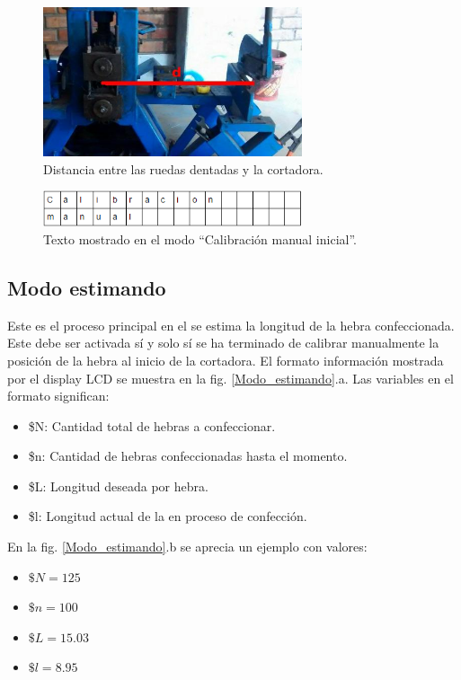 \documentclass[main_conf.tex]{subfiles}
\begin{document}
\begin{figure}[!t]
  \centering
  \includegraphics[width=3.0in]{../img/maquina/distancia_inicial.jpg}
  \caption{Distancia entre las ruedas dentadas y la cortadora.}
  \label{distancia_inicial}
\end{figure}

\begin{figure}[!t]
  \centering
  \includegraphics[width=3.0in]{../img/modo/Calibracion_manual_inicial.png}
  \caption{Texto mostrado en el modo “Calibración manual inicial”.}
  \label{Modo_Calibracion_manual_inicial}
\end{figure}

\subsection{Modo estimando}
Este es el proceso principal en el se estima la longitud de la hebra
confeccionada. Este debe ser activada sí y solo sí se ha terminado de
calibrar manualmente la posición de la hebra al inicio de la cortadora.
El formato información mostrada por el display LCD se muestra en la fig.
\ref{Modo_estimando}.a. Las variables en el formato significan:

\begin{itemize}
\item \$N: Cantidad total de hebras a confeccionar.
\item \$n: Cantidad de hebras confeccionadas hasta el momento.
\item \$L: Longitud deseada por hebra.
\item \$l: Longitud actual de la en proceso de confección.
\end{itemize}

En la fig. \ref{Modo_estimando}.b se aprecia un ejemplo con valores:
\begin{itemize}
\item $\$N = 125$
\item $\$n = 100$
\item $\$L = 15.03$
\item $\$l = 8.95$
\end{itemize}
\end{document}
